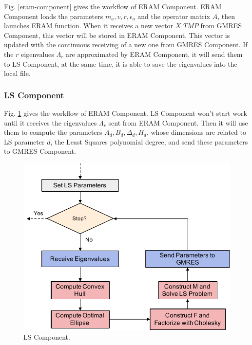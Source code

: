Fig. \ref{eram-component} gives the workflow of ERAM Component. ERAM Component loads the parameters $m_a, v, r, \epsilon_a$ and the operator matrix $A$, then launches ERAM function. When it receives a new vector $X\_TMP$ from GMRES Component, this vector will be stored in ERAM Component. This vector is updated with the continuous receiving of a new one from GMRES Component. If the $r$ eigenvalues $\Lambda_r$ are approximated by ERAM Component, it will send them to LS Component, at the same time, it is able to save the eigenvalues into the local file.

\subsubsection{LS Component}

Fig. \ref{ls-component} gives the workflow of ERAM Component. LS Component won't start work until it receives the eigenvalues $\Lambda_r$ sent from ERAM Component. Then it will use them to compute the parameters $A_d, B_d, \Delta_d, H_d$, whose dimensions are related to LS parameter $d$, the Least Squares polynomial degree, and send these parameters to GMRES Component.

\begin{figure}[htbp]
	\centering
	\includegraphics[width=4.8in]{fig/LS-component.pdf}
	\caption{LS Component.}
	\label{ls-component}
\end{figure}

